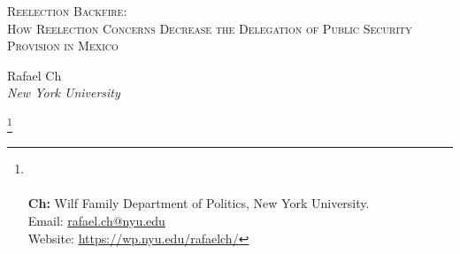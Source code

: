 \documentclass[12pt]{amsart}
\title{}
\numberwithin{equation}{section}
\theoremstyle{definition}
\theoremstyle{definition}
\theoremstyle{definition}
\begin{document}
	\vspace*{3ex minus 1ex}
	\begin{center}
		\Large \textsc{Reelection Backfire: \\ How Reelection Concerns Decrease the Delegation of Public Security Provision in Mexico}%
	\end{center}
	                            
	                
\date{May 4th, 2021} 
\vspace*{3ex minus 1ex}
	\begin{center}
		Rafael Ch\\
		
		\textit{New York University}\\
		
	\end{center}
	 
	\thanks{%
	\\
	 \\ \textbf{Ch:} Wilf Family Department of Politics, New York University. \\ Email: \url{rafael.ch@nyu.edu}
	 \\ Website: \url{https://wp.nyu.edu/rafaelch/}}
		  
\end{document}
